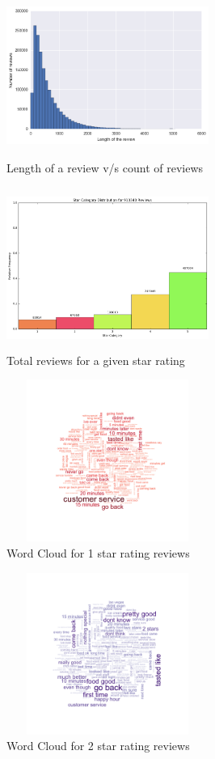 \documentclass[paper=a4, fontsize=11pt]{scrartcl} %
\numberwithin{equation}{section} %
\numberwithin{figure}{section} %
\numberwithin{table}{section} %
\begin{document}
\begin{figure}[!htb]
\centering
\includegraphics[width=250px, height = 200px]{len_count.png}
\caption{Length of a review v/s count of reviews}
\label{length_count}
\end{figure} 

\begin{figure}[!htb]
\centering
\includegraphics[width=250px, height = 200px]{star_review_count.png}
\caption{Total reviews for a given star rating}
\label{star_distribution}
\end{figure} 

\begin{figure}[!htb]
\centering
\includegraphics[width=250px, height = 200px]{1_star_wordcloud_500k.png}
\caption{Word Cloud for 1 star rating reviews}
\label{wc1}
\end{figure} 

\begin{figure}[!htb]
\centering
\includegraphics[width=250px, height = 200px]{2_star_wordcloud_500k.png}
\caption{Word Cloud for 2 star rating reviews}
\label{wc2}
\end{figure} 
\end{document}
